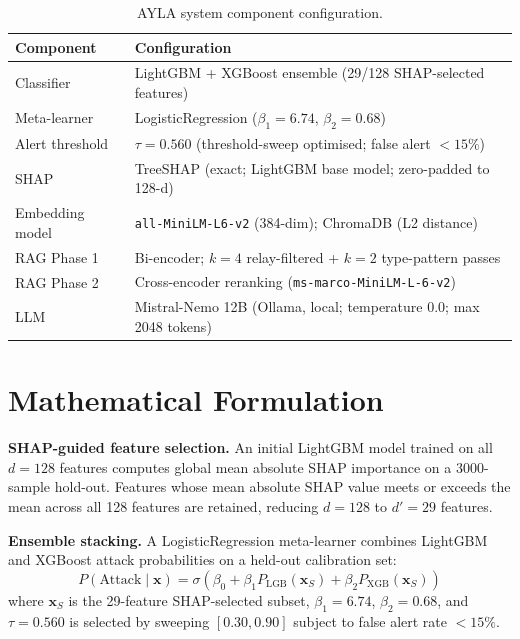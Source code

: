 \documentclass[twocolumn, 10pt, letterpaper]{article}
\begin{document}
\begin{table}[t]
\centering
\caption{AYLA system component configuration.}
\label{tab:config}
\small
\begin{tabular}{ll}
\toprule
\textbf{Component} & \textbf{Configuration} \\
\midrule
Classifier        & LightGBM \cite{ke2017lightgbm} + XGBoost \cite{chen2016xgboost}
                    ensemble (29/128 SHAP-selected features) \\
Meta-learner      & LogisticRegression ($\beta_1{=}6.74$, $\beta_2{=}0.68$) \\
Alert threshold   & $\tau = 0.560$ (threshold-sweep optimised; false alert $< 15\%$) \\
SHAP              & TreeSHAP \cite{lundberg2020treeshap} (exact; LightGBM base model;
                    zero-padded to 128-d) \\
Embedding model   & \texttt{all-MiniLM-L6-v2} (384-dim); ChromaDB (L2 distance) \\
RAG Phase 1       & Bi-encoder; $k{=}4$ relay-filtered + $k{=}2$ type-pattern passes \\
RAG Phase 2       & Cross-encoder reranking (\texttt{ms-marco-MiniLM-L-6-v2}) \\
LLM               & Mistral-Nemo 12B (Ollama, local; temperature 0.0; max 2048 tokens) \\
\bottomrule
\end{tabular}
\end{table}

\section{Mathematical Formulation}
\label{sec:math}

\textbf{SHAP-guided feature selection.}
An initial LightGBM model trained on all $d{=}128$ features computes global
mean absolute SHAP importance on a 3000-sample hold-out.
Features whose mean absolute SHAP value meets or exceeds the mean across all
128 features are retained, reducing $d{=}128$ to $d'{=}29$ features.

\textbf{Ensemble stacking.}
A LogisticRegression meta-learner combines LightGBM and XGBoost
attack probabilities on a held-out calibration set:
\begin{equation}
    P(\text{Attack} \mid \mathbf{x}) =
    \sigma\!\left(\beta_0
    + \beta_1 P_{\text{LGB}}(\mathbf{x}_S)
    + \beta_2 P_{\text{XGB}}(\mathbf{x}_S)\right)
    \label{eq:stack}
\end{equation}
where $\mathbf{x}_S$ is the 29-feature SHAP-selected subset,
$\beta_1 = 6.74$, $\beta_2 = 0.68$, and $\tau = 0.560$ is selected by
sweeping $[0.30, 0.90]$ subject to false alert rate $< 15\%$.
\end{document}
